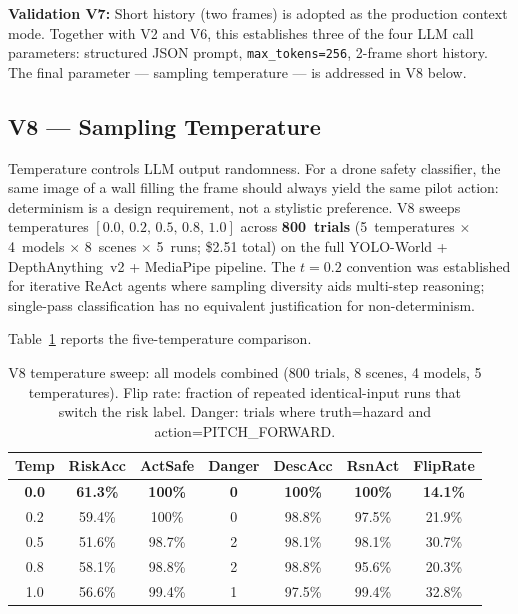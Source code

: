 \textbf{Validation V7:} Short history (two frames) is adopted as the production
context mode. Together with V2 and V6, this establishes three of the four LLM
call parameters: structured JSON prompt, \texttt{max\_tokens=256}, 2-frame
short history. The final parameter --- sampling temperature --- is addressed in
V8 below.

\subsection{V8 --- Sampling Temperature}
\label{sec:ch2_v8}

Temperature controls LLM output randomness. For a drone safety classifier, the
same image of a wall filling the frame should always yield the same pilot
action: determinism is a design requirement, not a stylistic preference. V8
sweeps temperatures $[0.0,\,0.2,\,0.5,\,0.8,\,1.0]$ across \textbf{800~trials}
(5~temperatures $\times$ 4~models $\times$ 8~scenes $\times$ 5~runs; \$2.51
total) on the full YOLO-World + DepthAnything~v2 + MediaPipe pipeline. The
$t=0.2$ convention \cite{yao2022react} was established for iterative ReAct
agents where sampling diversity aids multi-step reasoning; single-pass
classification has no equivalent justification for non-determinism.

Table~\ref{tab:ch2_v8_summary} reports the five-temperature comparison.

\begin{table}[ht]
  \caption{V8 temperature sweep: all models combined (800 trials, 8 scenes,
    4 models, 5 temperatures). Flip rate: fraction of repeated identical-input
    runs that switch the risk label. Danger: trials where truth=hazard and
    action=PITCH\_FORWARD.}
  \label{tab:ch2_v8_summary}
  \centering
  \small
  \begin{tabular}{ccccccc}
    \toprule
    Temp & RiskAcc & ActSafe & Danger & DescAcc & RsnAct & FlipRate \\
    \midrule
    \textbf{0.0} & \textbf{61.3\%} & \textbf{100\%} & \textbf{0} & \textbf{100\%} & \textbf{100\%} & \textbf{14.1\%} \\
    0.2          & 59.4\%          & 100\%          & 0          & 98.8\%         & 97.5\%         & 21.9\% \\
    0.5          & 51.6\%          & 98.7\%         & 2          & 98.1\%         & 98.1\%         & 30.7\% \\
    0.8          & 58.1\%          & 98.8\%         & 2          & 98.8\%         & 95.6\%         & 20.3\% \\
    1.0          & 56.6\%          & 99.4\%         & 1          & 97.5\%         & 99.4\%         & 32.8\% \\
    \bottomrule
  \end{tabular}
\end{table}

